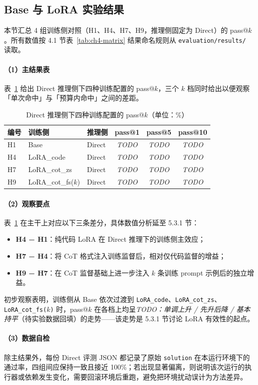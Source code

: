 \subsection{Base 与 LoRA 实验结果}

本节汇总 4 组训练侧对照（H1、H4、H7、H9，推理侧固定为 Direct）的 pass@$k$。所有数值按 4.1 节表~\ref{tab:ch4-matrix} 结果命名规则从 \texttt{evaluation/results/} 读取。

\paragraph{（1）主结果表}
表~\ref{tab:ch5-direct} 给出 Direct 推理侧下四种训练配置的 pass@$k$，三个 $k$ 档同时给出以便观察「单次命中」与「预算内命中」之间的差距。

\begin{table}[!htb]
  \centering
  \caption{Direct 推理侧下四种训练配置的 pass@$k$（单位：\%）}
  \label{tab:ch5-direct}
  \footnotesize
  \begin{tabular}{lllccc}
    \toprule
    编号 & 训练侧 & 推理侧 & pass@1 & pass@5 & pass@10 \\
    \midrule
    H1 & Base               & Direct & \textit{TODO} & \textit{TODO} & \textit{TODO} \\
    H4 & LoRA\_code         & Direct & \textit{TODO} & \textit{TODO} & \textit{TODO} \\
    H7 & LoRA\_cot\_zs      & Direct & \textit{TODO} & \textit{TODO} & \textit{TODO} \\
    H9 & LoRA\_cot\_fs($k$) & Direct & \textit{TODO} & \textit{TODO} & \textit{TODO} \\
    \bottomrule
  \end{tabular}
\end{table}


\paragraph{（2）观察要点}
表~\ref{tab:ch5-direct} 在主干上对应以下三条差分，具体数值分析延至 5.3.1 节：
\begin{itemize}
    \item \textbf{H4 − H1}：纯代码 LoRA 在 Direct 推理下的训练侧主效应；
    \item \textbf{H7 − H4}：将 CoT 格式注入训练监督后，相对仅代码监督的增益；
    \item \textbf{H9 − H7}：在 CoT 监督基础上进一步注入 $k$ 条训练 prompt 示例后的独立增益。
\end{itemize}
初步观察表明，训练侧从 Base 依次过渡到 \texttt{LoRA\_code}、\texttt{LoRA\_cot\_zs}、\texttt{LoRA\_cot\_fs($k$)} 时，pass@$k$ 在各档上均呈\textit{TODO：单调上升 / 先升后降 / 基本持平}（待实验数据回填）的走势——该走势是 5.3.1 节讨论 LoRA 有效性的起点。

\paragraph{（3）数据自检}
除主结果外，每份 Direct 评测 JSON 都记录了原始 \texttt{solution} 在本运行环境下的通过率，四组间应保持一致且接近 100\%；若出现显著偏离，则说明该次运行的执行器或依赖发生变化，需要回滚环境后重跑，避免把环境扰动误计为方法差异。
